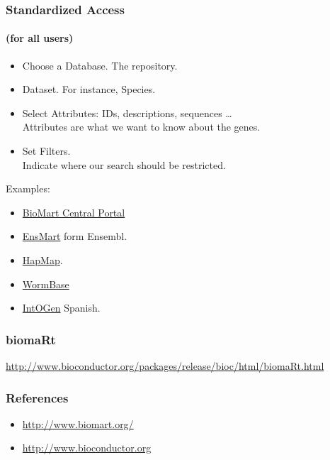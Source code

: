 \documentclass{beamer}
\begin{document}


\begin{frame}
  \frametitle{Standardized Access}
  \framesubtitle{(for all users)}
  
  \begin{itemize}
  \item Choose a Database. The repository.
  \item Dataset. For instance,  Species.
  \item Select Attributes: IDs, descriptions, sequences \dots \\
    Attributes are what we want to know about the genes.
  \item Set Filters. \\
    Indicate where our search should be restricted.
  \end{itemize}

  \bigskip

  Examples:
  
  \begin{itemize}
  \item \href{http://central.biomart.org/}{BioMart Central Portal}
  \item \href{http://www.ensembl.org/biomart/martview/857f918a2fae8d24602f998adfda2ef8}{EnsMart} form Ensembl.
  \item \href{http://hapmap.ncbi.nlm.nih.gov/biomart/martview/767d14a9a8473f2b6264357cd5afe8d8}{HapMap}.
  \item \href{http://caprica.caltech.edu:9002/biomart/martview/35a1d0dd0809f32472ff59325d39456e}{WormBase}
  \item \href{http://biomart.intogen.org/biomart/martview/b2abea454025567d06f7112de64c29b5}{IntOGen} Spanish.
  \end{itemize}

\end{frame}


\begin{frame}
  \frametitle{biomaRt}

  \url{http://www.bioconductor.org/packages/release/bioc/html/biomaRt.html}

\end{frame}  


\begin{frame}
  \frametitle{References}

  \begin{itemize}
  \item \url{http://www.biomart.org/}
  \item \url{http://www.bioconductor.org}
  \end{itemize}

\end{frame}  

\end{document}
